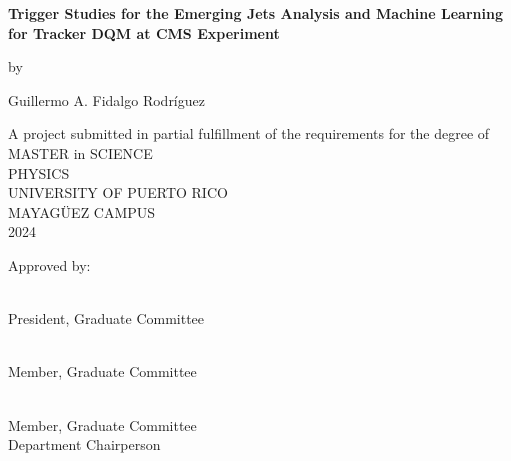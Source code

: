 \begin{titlepage}
	\begin{center}

		{\large
			\textbf{ \vspace{2mm} Trigger Studies for the Emerging Jets Analysis and Machine Learning for Tracker DQM at CMS Experiment}
		}

		\normalsize
		\vspace{0.55cm}
		by


		Guillermo A. Fidalgo Rodríguez
		\vspace{1cm}

		A project submitted in partial fulfillment of the requirements for the degree of\\
		\vspace{0.75cm}
		MASTER in SCIENCE \\
		PHYSICS\\
		\vspace{1cm}
		UNIVERSITY OF PUERTO RICO\\
		MAYAGÜEZ CAMPUS\\
		2024
		\vspace{1.5cm}

	\end{center}

	Approved by:

	\vspace{1.0cm}

	\\President, Graduate Committee

	\vspace{2.0cm}

	\\Member, Graduate Committee

	\vspace{2.0cm}

	\\Member, Graduate Committee
	\\Department Chairperson




\end{titlepage}
